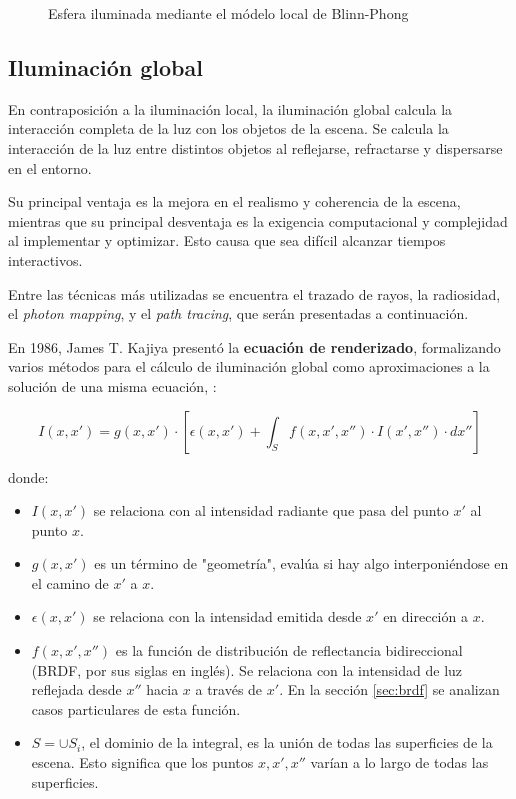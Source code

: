 \begin{figure}
\begin{center}
    \end{center}

    \caption{Esfera iluminada mediante el módelo local de Blinn-Phong}
    \label{fig:sphere-blinn-phong}
\end{figure}

\subsection{Iluminación global}

En contraposición a la iluminación local, la iluminación global calcula la interacción completa de la luz con los objetos de la escena.
Se calcula la interacción de la luz entre distintos objetos al reflejarse, refractarse y dispersarse en el entorno.

Su principal ventaja es la mejora en el realismo y coherencia de la escena, mientras que su principal desventaja es la exigencia computacional y complejidad al implementar y optimizar.
Esto causa que sea difícil alcanzar tiempos interactivos.

Entre las técnicas más utilizadas se encuentra el trazado de rayos, la radiosidad, el \textit{photon mapping}, y el \textit{path tracing}, que serán presentadas a continuación.

En 1986, James T. Kajiya presentó la \textbf{ecuación de renderizado}, formalizando varios métodos para el cálculo de iluminación global como aproximaciones a la solución de una misma ecuación, \cite{rendering-equation}:

\begin{equation}\label{eq:rendering-equation}
    I(x, x') = g(x, x') \cdot \left[\epsilon(x, x') + \int_S f(x, x', x'') \cdot I(x', x'') \cdot dx'' \right]
\end{equation}

donde:
\begin{itemize}
    \item $I(x, x')$ se relaciona con al intensidad radiante que pasa del punto $x'$ al punto $x$.
    \item $g(x, x')$ es un término de "geometría", evalúa si hay algo interponiéndose en el camino de $x'$ a $x$.
    \item $\epsilon(x, x')$ se relaciona con la intensidad emitida desde $x'$ en dirección a $x$.
    \item $f(x, x', x'')$ es la función de distribución de reflectancia bidireccional (BRDF, por sus siglas en inglés). Se relaciona con la intensidad de luz reflejada desde $x''$ hacia $x$ a través de $x'$. En la sección \ref{sec:brdf} se analizan casos particulares de esta función.
    \item $S = \cup{S_i}$, el dominio de la integral, es la unión de todas las superficies de la escena. Esto significa que los puntos $x, x', x''$ varían a lo largo de todas las superficies.
\end{itemize}

